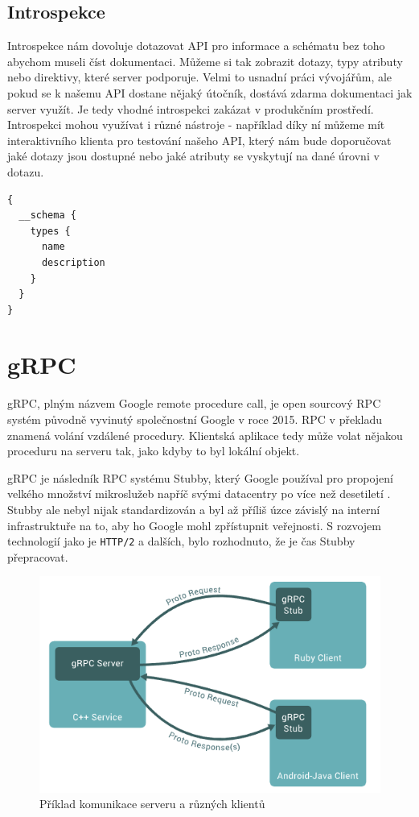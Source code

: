 \documentclass[thesis=M,czech]{FITthesis}[2019/12/23]
\begin{document}
\subsection{Introspekce}
Introspekce nám dovoluje dotazovat API pro informace a schématu bez toho abychom museli číst dokumentaci. Můžeme si tak zobrazit dotazy, typy atributy nebo direktivy, které server podporuje. Velmi to usnadní práci vývojářům, ale pokud se k našemu API dostane nějaký útočník, dostává zdarma dokumentaci jak server využít. Je tedy vhodné introspekci zakázat v produkčním prostředí.
Introspekci mohou využívat i různé nástroje - například díky ní můžeme mít interaktivního klienta pro testování našeho API, který nám bude doporučovat jaké dotazy jsou dostupné  nebo jaké atributy se vyskytují na dané úrovni v dotazu.

\begin{verbatim}
{
  __schema {
    types {
      name
      description 
    }
  }
}
\end{verbatim}

\section{gRPC}
gRPC, plným názvem Google remote procedure call, je open sourcový RPC systém původně vyvinutý společnostní Google v roce 2015. RPC v překladu znamená volání vzdálené procedury. Klientská aplikace tedy může volat nějakou proceduru na serveru tak, jako kdyby to byl lokální objekt.

gRPC je následník RPC systému Stubby, který Google používal pro propojení velkého množství mikroslužeb napříč svými datacentry po více než desetiletí \cite{grpc}. Stubby ale nebyl nijak standardizován a byl až příliš úzce závislý na interní infrastruktuře na to, aby ho Google mohl zpřístupnit veřejnosti. S rozvojem technologií jako je \texttt{HTTP/2} a dalších, bylo rozhodnuto, že je čas Stubby přepracovat.

\begin{figure}[H]
    \includegraphics[width=\linewidth]{img/grpc-overview.png}
    \caption{Příklad komunikace serveru a různých klientů}
	\label{grpc-overview}
\end{figure}
\end{document}
